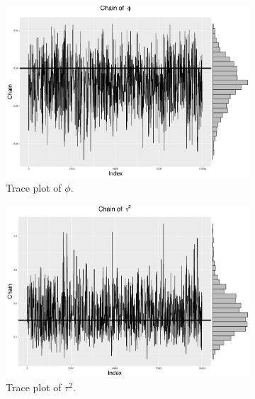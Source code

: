 \begin{figure}[h]
\centering
 \begin{subfigure}[b]{0.32\textwidth}
     \includegraphics[width=\textwidth]{Chapters/05MCMCOU/plots/linear_phi.pdf}
     \caption{Trace plot of $\phi$.}
\end{subfigure}
\begin{subfigure}[b]{0.32\textwidth}
    \includegraphics[width=\textwidth]{Chapters/05MCMCOU/plots/linear_tau2.pdf}
     \caption{Trace plot of $\tau^2$.}
\end{subfigure}
\begin{subfigure}[b]{0.32\textwidth} \

\end{subfigure}
\end{figure}
